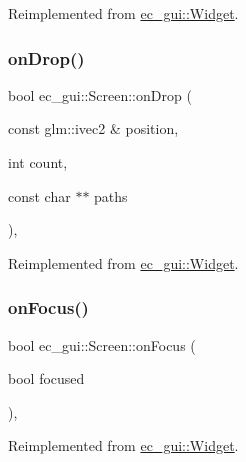 Reimplemented from \mbox{\hyperlink{classec__gui_1_1_widget_a3bb9779e3cb70af3f70df060753d24ae}{ec\+\_\+gui\+::\+Widget}}.

\mbox{\label{classec__gui_1_1_screen_a5554d10648c66060b5eb96c5ff918b58}} 
\subsubsection{\texorpdfstring{on\+Drop()}{onDrop()}}
{\footnotesize\ttfamily bool ec\+\_\+gui\+::\+Screen\+::on\+Drop (\begin{DoxyParamCaption}\item[{const glm\+::ivec2 \&}]{position,  }\item[{int}]{count,  }\item[{const char $\ast$$\ast$}]{paths }\end{DoxyParamCaption})\hspace{0.3cm}{\ttfamily [override]}, {\ttfamily [virtual]}}



Reimplemented from \mbox{\hyperlink{classec__gui_1_1_widget_a4f4db0e6b761f3d659f2426d152a0ae2}{ec\+\_\+gui\+::\+Widget}}.

\mbox{\label{classec__gui_1_1_screen_a24a7266d24d743aa7b4c4fce6e8d2235}} 
\subsubsection{\texorpdfstring{on\+Focus()}{onFocus()}}
{\footnotesize\ttfamily bool ec\+\_\+gui\+::\+Screen\+::on\+Focus (\begin{DoxyParamCaption}\item[{bool}]{focused }\end{DoxyParamCaption})\hspace{0.3cm}{\ttfamily [override]}, {\ttfamily [virtual]}}



Reimplemented from \mbox{\hyperlink{classec__gui_1_1_widget_a191230613536809bda9c930d3a2ced7c}{ec\+\_\+gui\+::\+Widget}}.

\mbox{\label{classec__gui_1_1_screen_a3eda49d97cc53349466a96d9549520f8}} 

